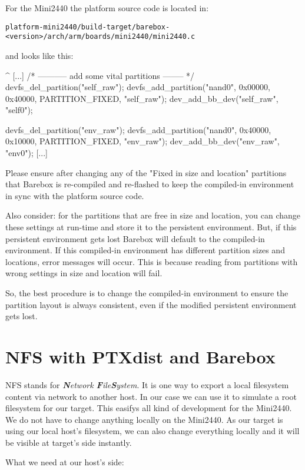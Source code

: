 For the Mini2440 the platform source code is located in:

\texttt{platform-mini2440/build-target/barebox-<version>/arch/arm/boards/mini2440/mini2440.c}

and looks like this:

\begin{ptxshell}[escapechar=|]{^}
[...]
      /* ----------- add some vital partitions -------- */
   devfs_del_partition("self_raw");
   devfs_add_partition("nand0", 0x00000, 0x40000, PARTITION_FIXED, "self_raw");
   dev_add_bb_dev("self_raw", "self0");

   devfs_del_partition("env_raw");
   devfs_add_partition("nand0", 0x40000, 0x10000, PARTITION_FIXED, "env_raw");
   dev_add_bb_dev("env_raw", "env0");
[...]
\end{ptxshell}

Please ensure after changing any of the "Fixed in size and location" partitions
that Barebox is re-compiled and re-flashed to keep the compiled-in environment
in sync with the platform source code.

Also consider: for the partitions that are free in size and location, you can
change these settings at run-time and store it to the persistent environment.
But, if this persistent environment gets lost Barebox will default to the
compiled-in environment. If this compiled-in environment has different
partition sizes and locations, error messages will occur. This is because
reading from partitions with wrong settings in size and location will fail.

So, the best procedure is to change the compiled-in environment to ensure the
partition layout is always consistent, even if the modified persistent
environment gets lost.

\section{NFS with PTXdist and Barebox}

NFS stands for \textit{\textbf{N}etwork \textbf{F}ile\textbf{S}ystem}. It is one
way to export a local filesystem content via network to another host. In our case
we can use it to simulate a root filesystem for our target. This easifys all kind
of development for the Mini2440. We do not have to change anything locally on the
Mini2440. As our target is using our local host's filesystem, we can also change
everything locally and it will be visible at target's side instantly.

What we need at our host's side:


